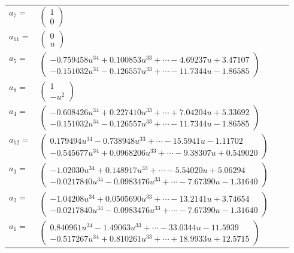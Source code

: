 \documentclass[1p]{elsarticle_modified}
\theoremstyle{definition}
\begin{document}
\begin{tabular}{m{7pt} m{180pt} m{7pt} m{180pt} }
\flushright $a_{7}=$&$\begin{pmatrix}1\\0\end{pmatrix}$ \\
\flushright $a_{11}=$&$\begin{pmatrix}0\\u\end{pmatrix}$ \\
\flushright $a_{5}=$&$\begin{pmatrix}-0.759458 u^{34}+0.100853 u^{33}+\cdots-4.69237 u+3.47107\\-0.151032 u^{34}-0.126557 u^{33}+\cdots-11.7344 u-1.86585\end{pmatrix}$ \\
\flushright $a_{8}=$&$\begin{pmatrix}1\\- u^2\end{pmatrix}$ \\
\flushright $a_{4}=$&$\begin{pmatrix}-0.608426 u^{34}+0.227410 u^{33}+\cdots+7.04204 u+5.33692\\-0.151032 u^{34}-0.126557 u^{33}+\cdots-11.7344 u-1.86585\end{pmatrix}$ \\
\flushright $a_{12}=$&$\begin{pmatrix}0.179494 u^{34}-0.738948 u^{33}+\cdots-15.5941 u-1.11702\\-0.545677 u^{34}+0.0968206 u^{33}+\cdots-9.38307 u+0.549020\end{pmatrix}$ \\
\flushright $a_{3}=$&$\begin{pmatrix}-1.02030 u^{34}+0.148917 u^{33}+\cdots-5.54020 u+5.06294\\-0.0217840 u^{34}-0.0983476 u^{33}+\cdots-7.67390 u-1.31640\end{pmatrix}$ \\
\flushright $a_{2}=$&$\begin{pmatrix}-1.04208 u^{34}+0.0505690 u^{33}+\cdots-13.2141 u+3.74654\\-0.0217840 u^{34}-0.0983476 u^{33}+\cdots-7.67390 u-1.31640\end{pmatrix}$ \\
\flushright $a_{1}=$&$\begin{pmatrix}0.840961 u^{34}-1.49063 u^{33}+\cdots-33.0344 u-11.5939\\-0.517267 u^{34}+0.810261 u^{33}+\cdots+18.9933 u+12.5715\end{pmatrix}$ \\

\end{tabular}
\end{document}

